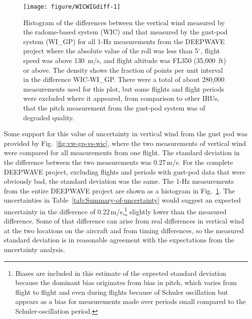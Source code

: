 \documentclass[12pt,twoside,english]{article}\usepackage[]{graphicx}\usepackage[]{color}
\newenvironment{knitrout}{}{} %
\let\OrgIndex\index
\renewcommand*{\index}[1]{\OrgIndex{#1}}
\begin{document}
\begin{knitrout}
\color{fgcolor}\begin{figure}
\texttt{[image: figure/WICWIGdiff-1]} \caption[Histogram of the differences between the vertical wind measured by the radome-based system and that measured by the gust-pod system.]{Histogram of the differences between the vertical wind measured by the radome-based system (WIC) and that measured by the gust-pod system (WI\_GP) for all 1-Hz measurements from the DEEPWAVE project where the absolute value of the roll was less than 5$^{\circ}$, flight speed was above 130~m/s, and flight altitude was FL350 (35,000~ft) or above. The density shows the fraction of points per unit interval in the difference WIC-WI\_GP. There were a total of about 280,000 measurements used for this plot, but some flights and flight periods were excluded where it appeared, from comparison to other IRUs, that the pitch measurement from the gust-pod system was of degraded quality.}\label{fig:WICWIGdiff}
\end{figure}


\end{knitrout}

Some support for this value of uncertainty in vertical wind from the gust pod was provided by Fig.~\ref{fig:vw-gp-vs-wic}, where the two measurements of vertical wind were compared for all measurements from one flight. The standard deviation in the difference between the two measurements was 0.27\,m/s. For the complete DEEPWAVE project, excluding flights and periods with gust-pod data that were obviously bad, the standard deviation was the same. The 1-Hz measurements from the entire DEEPWAVE project are shown as a histogram in Fig.~\ref{fig:WICWIGdiff}. The uncertainties in Table~\ref{tab:Summary-of-uncertainty} would suggest an expected uncertainty in the difference of 0.22\,m/s,\footnote{Biases are included in this estimate of the expected standard deviation because the dominant bias originates from bias in pitch, which varies from flight to flight and even during flights because of Schuler oscillation but appears as a bias for measurements made over periods small compared to the Schuler-oscillation period.} slightly lower than the measured difference. Some of that difference can arise from real differences in vertical wind at the two locations on the aircraft and from timing differences, so the measured standard deviation is in reasonable agreement with the expectations from the uncertainty analysis. 
\end{document}
